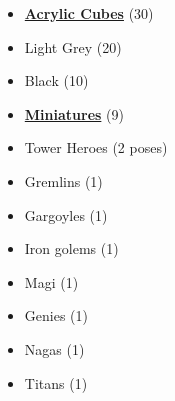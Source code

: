 \begin{multicols}{3}
\begin{itemize}[leftmargin=0pt, label={}, noitemsep, noitemsep]
  \item \textbf{\underline{Acrylic Cubes}} (30)
  \item Light Grey (20)
  \item Black (10)
\end{itemize}

\begin{itemize}[leftmargin=0pt, label={}, noitemsep, noitemsep]
  \item \textbf{\underline{Miniatures}} (9)
  \item Tower Heroes (2 poses)
  \item Gremlins (1)
  \item Gargoyles (1)
  \item Iron golems (1)
  \item Magi (1)
  \item Genies (1)
  \item Nagas (1)
  \item Titans (1)
\end{itemize}


\end{multicols}
